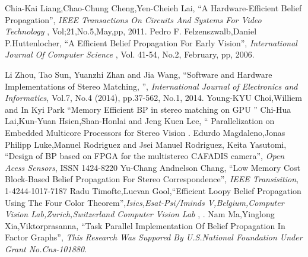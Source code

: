 \begin{thebibliography}{1}

 Chia-Kai Liang,Chao-Chung Cheng,Yen-Cheieh Lai, ``A Hardware-Efficient Belief Propagation'', \emph{IEEE Transactions On Circuits And Systems For Video Technology }, Vol;21,No.5,May,pp, 2011.
 Pedro F. Felzenszwalb,Daniel P.Huttenlocher, ``A Efficient Belief Propagation For Early Vision'', \emph{International Journal Of  Computer Science  }, Vol. 41-54, No.2, February, pp, 2006.

 Li Zhou, Tao Sun, Yuanzhi Zhan and Jia Wang, ``Software and Hardware Implementations of Stereo Matching,
'', \emph{International Journal of Electronics and Informatics}, Vol.7, No.4 (2014), pp.37-562, No.1, 2014.
 Young-KYU Choi,Williem and In Kyi Park  ``Memory Efficient BP in stereo matching on GPU ''
 Chi-Hua Lai,Kun-Yuan Hsien,Shan-Honlai and Jeng Kuen Lee, `` Parallelization on Embedded Multicore    Processors for Stereo Vision .
 Edurdo Magdaleno,Jonas Philipp Luke,Manuel Rodriguez and Jsei Manuel Rodriguez, Keita Yasutomi, ``Design of BP based on FPGA for the multistereo CAFADIS camera'', \emph{Open Acess Sensors}, ISSN 1424-8220
 Yu-Chang Andnelson Chang, ``Low Memory Cost Block-Based Belief Propagation For Stereo Correspondence'', \emph{IEEE Transisition}, 1-4244-1017-7187
 Radu Timofte,Lucvan Gool,``Efficient Loopy Belief Propagation Using The Four Color Theorem'',\emph{Isics,Esat-Psi/Iminds V,Belgium,Computer Vision Lab,Zurich,Switzerland Computer Vision Lab }, .
 Nam Ma,Yinglong Xia,Viktorprasanna, ``Task Parallel Implementation Of Belief Propagation In Factor Graphs'', \emph{This Research Was Suppored By U.S.National Foundation Under Grant No.Cns-101880}.

\end{thebibliography}
